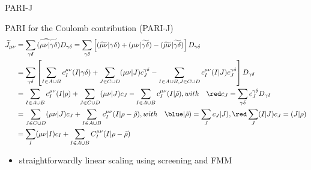 \begin{frame}{PARI-J}
\footnotesize

PARI for the Coulomb contribution (PARI-J)
\begin{equation*}
\begin{split}
  \widetilde{J}_{\mu\nu} &=  \sum_{\gamma\delta} \widetilde{(\mu\nu|\gamma\delta)} D_{\gamma\delta} 
  = \sum_{\gamma\delta} \left[  (\widetilde{\mu\nu}|\gamma\delta) +  (\mu\nu|\widetilde{\gamma\delta}) -  (\widetilde{\mu\nu}|\widetilde{\gamma\delta}) \right]  D_{\gamma\delta}\\
   &=  \sum_{\gamma\delta} \left[ \sum_{I\in{A\cup B}}c_I^{\mu\nu} (I|\gamma\delta) + \sum_{J\in{C\cup D}} (\mu\nu|J) c_J^{\gamma\delta} - \sum_{I\in{A\cup B},J\in{C\cup D}}c_I^{\mu\nu} (I|J) c_J^{\gamma\delta} \right]  D_{\gamma\delta}\\
   &=  \sum_{I\in{A\cup B}}c_I^{\mu\nu} (I|\rho) + \sum_{J\in{C\cup D}} (\mu\nu|J) c_J - \sum_{I\in{A\cup B}}c_I^{\mu\nu} (I| \tilde{\rho}),  with \quad \red c_J = \sum_{\gamma\delta} c_J^{\gamma\delta} D_{\gamma\delta} \\
 &= \sum_{J\in{C\cup D}} (\mu\nu|J) c_J +  \sum_{I\in{A\cup B}}c_I^{\mu\nu} (I|\rho-\tilde{\rho}), with \quad 
\blue |\tilde\rho) = \sum_J c_J|J),  \red \sum_J (I|J)c_J = (J|\rho) \\
   & = \sum_I (\mu\nu|I)c_I + \sum_{I\in{A\cup B}} C_I^{\mu\nu}(I|\rho-\tilde\rho)
\end{split}
\end{equation*}
\begin{itemize}
  \item straightforwardly linear scaling using screening and FMM
\end{itemize}
\end{frame}
%

\frametitle{}
\framesubtitle{}

